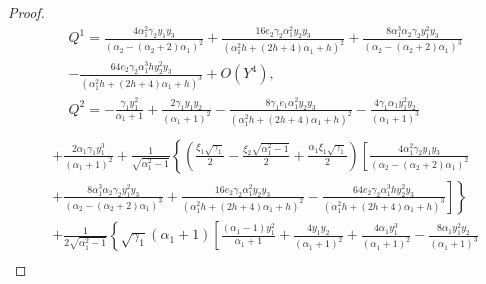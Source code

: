 \documentclass{ws-ijbc}
\begin{document}
\begin{proof}
{\begin{equation*}
\begin{aligned}
&Q^{1}=\frac{4 \alpha_{1}^{2} \gamma_{2} y_{1} y_{3}}{\left(\alpha_{2}-\left(\alpha_{2}+2\right) \alpha_{1}\right)^{2}}+\frac{16 e_{2} \gamma_{2} \alpha_{1}^{2}y_{2} y_{3}}{\left(\alpha_{1}^{2} h +\left(2 h +4\right) \alpha_{1}+h \right)^{2}}
                              +\frac{8 \alpha_{1}^{3} \alpha_{2} \gamma_{2} y_{1}^{2} y_{3}}{\left(\alpha_{2}
                              -\left(\alpha_{2}+2\right) \alpha_{1}\right)^{3}}\\
 &-\frac{64 e_{2} \gamma_{2} \alpha_{1}^{3} h y_{2}^{2} y_{3} }{\left(\alpha_{1}^{2} h +\left(2 h +4\right) \alpha_{1}+h \right)^{3}}+O\left(Y^{4}\right),\\
&Q^{2}=-\frac{\gamma_{1} y_{1}^{2}}{\alpha_{1}+1}+\frac{2 \gamma_{1} y_{1} y_{2}}{\left(\alpha_{1}+1\right)^{2}}-\frac{8 \gamma_{1} e_{1} \alpha_{1}^{2} y_{2} y_{3}}{\left(\alpha_{1}^{2} h +\left(2 h +4\right) \alpha_{1}+h \right)^{2}}
                              -\frac{4 \gamma_{1}\alpha_{1} y_{1}^{2} y_{2} }{\left(\alpha_{1}+1\right)^{3}}\\
                                \end{aligned}
\end{equation*}
                              \begin{equation*}
 \begin{aligned}
                              &+\frac{2 \alpha_{1} \gamma_{1} y_{1}^{3}}{\left(\alpha_{1}+1\right)^{2}}+\frac{1}{\sqrt{\alpha_{1}^{2}-1}}\left\{(\frac{\xi_{1} \sqrt{\gamma_{1}}}{2}-\frac{\xi_{2} \sqrt{\alpha_{1}^{2}-1}}{2}+\frac{\alpha_{1} \xi_{1} \sqrt{\gamma_{1}}}{2})\left[\frac{4\alpha_{1}^{2} \gamma_{2} y_{1} y_{3}}{\left(\alpha_{2}-\left(\alpha_{2}+2\right) \alpha_{1}\right)^{2}}\right.\right.\\
                              &\left.\left.+\frac{8 \alpha_{1}^{3} \alpha_{2} \gamma_{2} y_{1}^{2} y_{3}}{\left(\alpha_{2}-\left(\alpha_{2}+2\right) \alpha_{1}\right)^{3}}
                              +\frac{16 e_{2} \gamma_{2}\alpha_{1}^{2} y_{2} y_{3} }{\left(\alpha_{1}^{2} h +\left(2 h +4\right) \alpha_{1}+h \right)^{2}}
                              -\frac{64 e_{2} \gamma_{2}  \alpha_{1}^{3} hy_{2}^{2} y_{3} }{\left(\alpha_{1}^{2} h +\left(2 h +4\right) \alpha_{1}+h \right)^{3}}\right]\right\}\\
                              &+\frac{1}{2\sqrt{\alpha_{1}^{2}-1}}\left\{\sqrt{\gamma_{1}}\left(\alpha_{1}+1\right)
                              \left[\frac{(\alpha_{1}-1)y_{1}^{2} }{\alpha_{1}+1}
                              +\frac{4 y_{1} y_{2}}{\left(\alpha_{1}+1\right)^{2}}+\frac{4  \alpha_{1}y_{1}^{3} }{\left(\alpha_{1}+1\right)^{2}}-\frac{8\alpha_{1} y_{1}^{2} y_{2}}{\left(\alpha_{1}+1\right)^{3}}\right.\right.\\

\end{aligned}
\end{equation*}}
\end{proof}
\end{document}

